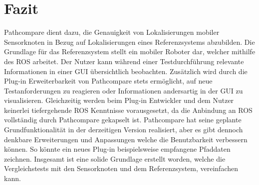 \chapter{Fazit}
\label{sec:conclusion}
Pathcompare dient dazu, die Genauigkeit von Lokalisierungen mobiler
Sensorknoten in Bezug auf Lokalisierungen eines Referenzsystems abzubilden.
Die Grundlage für das Referenzsystem stellt ein mobiler Roboter dar, welcher
mithilfe des ROS arbeitet. Der Nutzer kann während einer
Testdurchführung relevante Informationen in einer GUI übersichtlich beobachten. 
Zusätzlich wird durch die Plug-in Erweiterbarkeit von Pathcompare stets
ermöglicht, auf neue Testanforderungen zu reagieren oder Informationen
andersartig in der GUI zu visualisieren. Gleichzeitig werden beim Plug-in
Entwickler und dem Nutzer keinerlei tiefergehende ROS Kenntnisse vorausgesetzt,
da die Anbindung an ROS vollständig durch Pathcompare gekapselt ist. 
Pathcompare hat seine geplante Grundfunktionalität in der derzeitigen Version
realisiert, aber es gibt dennoch denkbare Erweiterungen und Anpassungen welche die
Benutzbarkeit verbessern können. So könnte ein neues Plug-in beispielsweise
empfangene Pfaddaten zeichnen. Insgesamt ist eine solide Grundlage erstellt
worden, welche die Vergleichstests mit den Sensorknoten und dem Referenzsystem,
vereinfachen kann.

